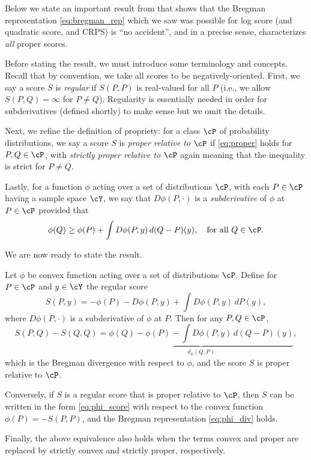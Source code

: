 \documentclass{article}
\begin{document}
Below we state an important result from \citet{gneiting2007strictly} that shows
that the Bregman representation \eqref{eq:bregman_rep} which we saw was possible 
for log score (and quadratic score, and CRPS) is ``no accident'', and in a
precise sense, characterizes \emph{all} proper scores.    

Before stating the result, we must introduce some terminology and
concepts. Recall that by convention, we take all scores to be
negatively-oriented. First, we say a score $S$ is \emph{regular} if $S(P,P)$ is 
real-valued for all $P$ (i.e., we allow $S(P, Q) = \infty$ for $P \not=
Q$). Regularity is essentially needed in order for subderivatives (defined 
shortly) to make sense but we omit the details. 

Next, we refine the definition of propriety: for a class $\cP$ of probability
distributions, we say a score $S$ is \emph{proper relative to $\cP$} if
\eqref{eq:proper} holds for $P,Q \in \cP$, with \emph{strictly proper relative 
  to $\cP$} again meaning that the inequality is strict for $P \not= Q$.  

Lastly, for a function $\phi$ acting over a set of distributions $\cP$, with
each $P \in \cP$ having a sample space $\cY$, we say that $D\phi(P, \cdot)$ is a
\emph{subderivative} of $\phi$ at $P \in \cP$ provided that 
\begin{equation}
\label{eq:subderiv}
\phi(Q) \geq \phi(P) + \int D\phi(P, y) \, d(Q-P)(y), \quad \text{for all $Q \in
  \cP$}.  
\end{equation}

We are now ready to state the result. 

\begin{theorem}
Let $\phi$ be convex function acting over a set of distributions $\cP$. Define
for $P \in \cP$ and $y \in \cY$ the regular score  
\begin{equation}
\label{eq:phi_score}
S(P, y) = -\phi(P) - D\phi(P, y) + \int D\phi(P, y) \, dP(y),
\end{equation}
where $D\phi(P, \cdot)$ is a subderivative of $\phi$ at $P$. Then for any $P,Q
\in \cP$, 
\begin{equation}
\label{eq:phi_div}
S(P, Q) - S(Q, Q) = \underbrace{\phi(Q) - \phi(P) - \int D\phi(P, y) \,
  d(Q-P)(y)}_{d_\phi(Q,P)},
\end{equation}
which is the Bregman divergence with respect to $\phi$, and the score $S$ is
proper relative to $\cP$.  

Conversely, if $S$ is a regular score that is proper relative to $\cP$, then $S$
can be written in the form \eqref{eq:phi_score} with respect to the convex
function $\phi(P) = -S(P, P)$, and the Bregman representation \eqref{eq:phi_div}
holds.    

Finally, the above equivalence also holds when the terms convex and proper are
replaced by strictly convex and strictly proper, respectively.  
\end{theorem}
\end{document}
